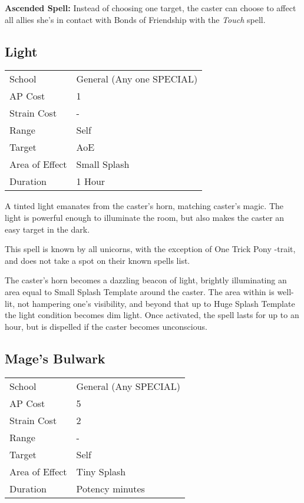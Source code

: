 \documentclass[11pt,a4paper,twocolumn]{book}
\begin{document}
\bigskip

\textbf{Ascended Spell:} Instead of choosing one target, the caster can choose to affect all allies she's in contact with Bonds of Friendship with the \textit{Touch} spell.


\subsection*{Light}
{
	\begin{tabu} to 75mm{| X[l,4] | X[l,7] |}
		\hline
		School 			& General (Any one SPECIAL) 		\\
		AP Cost	      	& 1 								\\
		Strain Cost     & - 								\\
		Range     		& Self 								\\
		Target      	& AoE								\\
		Area of Effect  & Small Splash  	 					\\
		Duration     	& 1 Hour							\\ \hline
	\end{tabu}
	
}

\medskip

A tinted light emanates from the caster's horn, matching caster's magic. The light is powerful enough to illuminate the room, but also makes the caster an easy target in the dark.

This spell is known by all unicorns, with the exception of One Trick Pony -trait, and does not take a spot on their known spells list.

The caster's horn becomes a dazzling beacon of light, brightly illuminating an area equal to Small Splash Template around the caster. The area within is well-lit, not hampering one's visibility, and beyond that up to Huge Splash Template the light condition becomes dim light. Once activated, the spell lasts for up to an hour, but is dispelled if the caster becomes unconscious.

\vfill

\subsection*{Mage's Bulwark}
{
	\begin{tabu} to 75mm{| X[l,4] | X[l,7] |}
		\hline
		School 			& General (Any SPECIAL) 	\\
		AP Cost	      	& 5 					\\
		Strain Cost     & 2 					\\
		Range     		& - 					\\
		Target      	& Self					\\
		Area of Effect  & Tiny Splash  	 				\\
		Duration     	& Potency minutes		\\ \hline
	\end{tabu}
	
}
\end{document}
